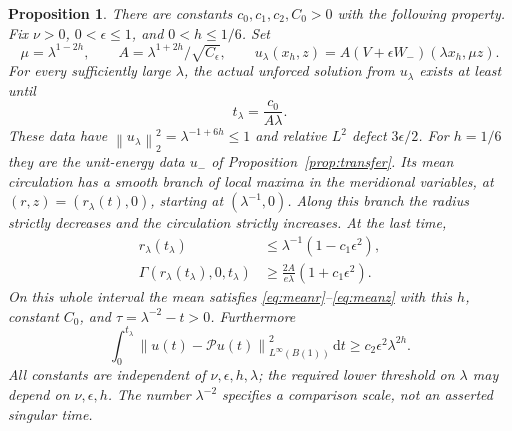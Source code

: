 \documentclass[11pt]{article}
\newtheorem{proposition}[theorem]{Proposition}
\theoremstyle{remark}
\newcommand{\PP}{\mathcal P}
\newcommand{\dd}{\,\mathrm d}
\newcommand{\norm}[1]{\left\lVert#1\right\rVert}
\begin{document}
\begin{proposition}\label{prop:inwardwindow}
There are constants $c_0,c_1,c_2,C_0>0$ with the following property.
Fix $\nu>0$, $0<\epsilon\leq1$, and $0<h\leq1/6$. Set
\[
 \mu=\lambda^{1-2h},\qquad A=\lambda^{1+2h}/\sqrt{C_\epsilon},
 \qquad u_\lambda(x_h,z)=A(V+\epsilon W_-)(\lambda x_h,\mu z).
\]
For every sufficiently large $\lambda$, the actual unforced solution
from $u_\lambda$ exists at least until
\[
 t_\lambda=\frac{c_0}{A\lambda}.
\]
These data have $\norm{u_\lambda}_2^2=\lambda^{-1+6h}\leq1$
and relative $L^2$ defect $3\epsilon/2$. For $h=1/6$ they are the
unit-energy data $u_-$ of Proposition~\ref{prop:transfer}.
Its mean circulation has a smooth branch of local maxima in the
meridional variables, at $(r,z)=(r_\lambda(t),0)$, starting at
$(\lambda^{-1},0)$. Along this branch the radius strictly decreases
and the circulation strictly increases. At the last time,
\begin{align}
 r_\lambda(t_\lambda)&\leq\lambda^{-1}(1-c_1\epsilon^2),
 \label{eq:inwardradius}\\
 \Gamma(r_\lambda(t_\lambda),0,t_\lambda)
 &\geq\frac{2A}{e\lambda}(1+c_1\epsilon^2).
 \label{eq:inwardgain}
\end{align}
On this whole interval the mean satisfies
\eqref{eq:meanr}--\eqref{eq:meanz} with this $h$, constant $C_0$,
and $\tau=\lambda^{-2}-t>0$. Furthermore
\begin{equation}\label{eq:actualhistorylower}
 \int_0^{t_\lambda}\norm{u(t)-\PP u(t)}_{L^\infty(B(1))}^2\dd t
                      \geq c_2\epsilon^2\lambda^{2h}.
\end{equation}
All constants are independent of $\nu,\epsilon,h,\lambda$; the required
lower threshold on $\lambda$ may depend on $\nu,\epsilon,h$.
The number $\lambda^{-2}$ specifies a comparison scale, not an asserted
singular time.
\end{proposition}
\end{document}

